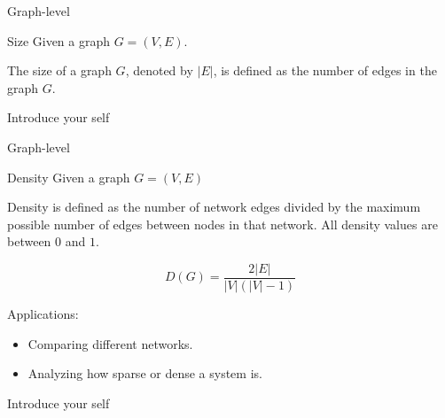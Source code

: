 \documentclass{beamer}
\begin{document}
    \begin{frame}{Graph-level}
        \begin{exampleblock}{Size}
            Given a graph $G = (V, E)$.
            
            The size of a graph $G$, denoted by $|E|$, is defined as the number of edges in the graph $G$.
            
        \end{exampleblock}

        \begin{note}
            {Introduce your self}
        \end{note}
    \end{frame}
    
    \begin{frame}{Graph-level}
        \begin{exampleblock}{Density}
            Given a graph $G = (V, E)$
            
            Density is defined as the number of network edges divided by the maximum possible number of edges between nodes in that network. All density values are between $0$ and $1$.

            \begin{equation}
                D(G) = \frac{2|E|}{|V|(|V| - 1)}
                \label{eq:density}
            \end{equation}
            
        \end{exampleblock}

        Applications:
        \begin{itemize}
            \item Comparing different networks.
            \item Analyzing how sparse or dense a system is.
        \end{itemize}
        
        \begin{note}
            {Introduce your self}
        \end{note}
    \end{frame}
\end{document}
